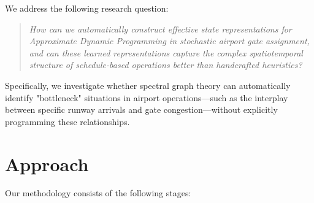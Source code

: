 We address the following research question:

\begin{quote}
	\textit{How can we automatically construct effective state representations for Approximate Dynamic Programming in stochastic airport gate assignment, and can these learned representations capture the complex spatiotemporal structure of schedule-based operations better than handcrafted heuristics?}
\end{quote}

Specifically, we investigate whether spectral graph theory can automatically identify "bottleneck" situations in airport operations—such as the interplay between specific runway arrivals and gate congestion—without explicitly programming these relationships.

\section{Approach}

Our methodology consists of the following stages:


